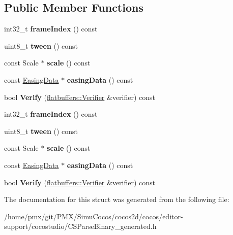 \subsection*{Public Member Functions}
\begin{DoxyCompactItemize}
\item 
\mbox{\label{structflatbuffers_1_1ScaleFrame_a34c1c77b84964cb6f48d3d95189ef31e}} 
int32\+\_\+t {\bfseries frame\+Index} () const
\item 
\mbox{\label{structflatbuffers_1_1ScaleFrame_a94ed187fe35331745393bab771d1cc81}} 
uint8\+\_\+t {\bfseries tween} () const
\item 
\mbox{\label{structflatbuffers_1_1ScaleFrame_a43240c48306b7edb9fc1dd94bdbea1cd}} 
const Scale $\ast$ {\bfseries scale} () const
\item 
\mbox{\label{structflatbuffers_1_1ScaleFrame_ad17ab4a0cd1e541a12dbcd1997fdf96d}} 
const \hyperlink{structflatbuffers_1_1EasingData}{Easing\+Data} $\ast$ {\bfseries easing\+Data} () const
\item 
\mbox{\label{structflatbuffers_1_1ScaleFrame_a6ee057aa20a889d048feb65b2b472ad6}} 
bool {\bfseries Verify} (\hyperlink{classflatbuffers_1_1Verifier}{flatbuffers\+::\+Verifier} \&verifier) const
\item 
\mbox{\label{structflatbuffers_1_1ScaleFrame_a34c1c77b84964cb6f48d3d95189ef31e}} 
int32\+\_\+t {\bfseries frame\+Index} () const
\item 
\mbox{\label{structflatbuffers_1_1ScaleFrame_a94ed187fe35331745393bab771d1cc81}} 
uint8\+\_\+t {\bfseries tween} () const
\item 
\mbox{\label{structflatbuffers_1_1ScaleFrame_a43240c48306b7edb9fc1dd94bdbea1cd}} 
const Scale $\ast$ {\bfseries scale} () const
\item 
\mbox{\label{structflatbuffers_1_1ScaleFrame_ad17ab4a0cd1e541a12dbcd1997fdf96d}} 
const \hyperlink{structflatbuffers_1_1EasingData}{Easing\+Data} $\ast$ {\bfseries easing\+Data} () const
\item 
\mbox{\label{structflatbuffers_1_1ScaleFrame_a6ee057aa20a889d048feb65b2b472ad6}} 
bool {\bfseries Verify} (\hyperlink{classflatbuffers_1_1Verifier}{flatbuffers\+::\+Verifier} \&verifier) const
\end{DoxyCompactItemize}


The documentation for this struct was generated from the following file\+:\begin{DoxyCompactItemize}
\item 
/home/pmx/git/\+P\+M\+X/\+Simu\+Cocos/cocos2d/cocos/editor-\/support/cocostudio/C\+S\+Parse\+Binary\+\_\+generated.\+h\end{DoxyCompactItemize}
